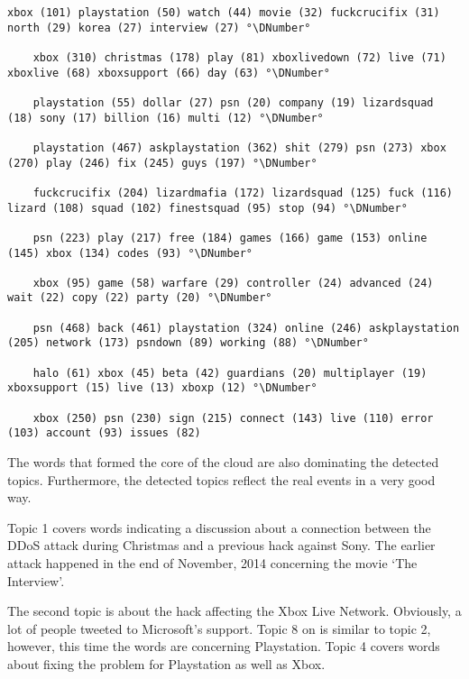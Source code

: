 \begin{lstlisting}[caption={[Topic Model for Christmas Network Outage] Topic Model for Christmas Network Outage}, label={lst:topic-model-network}, float=h]
	xbox (101) playstation (50) watch (44) movie (32) fuckcrucifix (31) north (29) korea (27) interview (27) °\DNumber°

	xbox (310) christmas (178) play (81) xboxlivedown (72) live (71) xboxlive (68) xboxsupport (66) day (63) °\DNumber°

	playstation (55) dollar (27) psn (20) company (19) lizardsquad (18) sony (17) billion (16) multi (12) °\DNumber°

	playstation (467) askplaystation (362) shit (279) psn (273) xbox (270) play (246) fix (245) guys (197) °\DNumber°

	fuckcrucifix (204) lizardmafia (172) lizardsquad (125) fuck (116) lizard (108) squad (102) finestsquad (95) stop (94) °\DNumber°

	psn (223) play (217) free (184) games (166) game (153) online (145) xbox (134) codes (93) °\DNumber°

	xbox (95) game (58) warfare (29) controller (24) advanced (24) wait (22) copy (22) party (20) °\DNumber°

	psn (468) back (461) playstation (324) online (246) askplaystation (205) network (173) psndown (89) working (88) °\DNumber°

	halo (61) xbox (45) beta (42) guardians (20) multiplayer (19) xboxsupport (15) live (13) xboxp (12) °\DNumber°

	xbox (250) psn (230) sign (215) connect (143) live (110) error (103) account (93) issues (82) 
\end{lstlisting}

The words that formed the core of the cloud are also dominating the detected topics. Furthermore, the detected topics reflect the real events in a very good way.

Topic 1 covers words indicating a discussion about a connection between the DDoS attack during Christmas and a previous hack against Sony. The earlier attack happened in the end of November, 2014 concerning the movie ‘The Interview’.\cite{bbc2014the}

The second topic is about the hack affecting the Xbox Live Network. Obviously, a lot of people tweeted to Microsoft's support.
Topic 8 on is similar to topic 2, however, this time the words are concerning Playstation.
Topic 4 covers words about fixing the problem for Playstation as well as Xbox.

